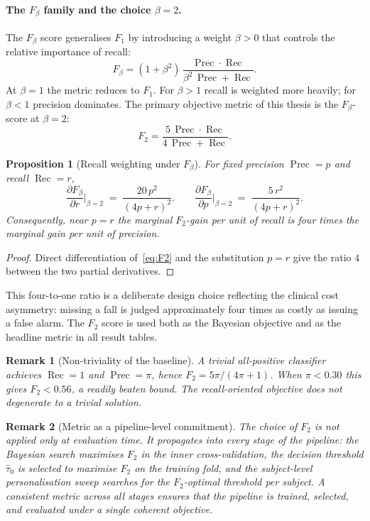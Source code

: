 \documentclass[onluarkali,ingilizce,yukseklisans,karton,LisansustuEgitim]{itutez}
\newtheorem{proposition}{Proposition}[chapter]
\newtheorem{remark}{Remark}[chapter]
\DeclareMathOperator{\Rec}{Rec}
\DeclareMathOperator{\Prec}{Prec}
\providecommand{\1}{\mathbf{1}}
\begin{document}
\paragraph{The $F_\beta$ family and the choice $\beta=2$.}
The $F_\beta$ score generalises $F_1$ by introducing a weight $\beta>0$ that controls the relative importance of recall:
\begin{equation}
  F_\beta = (1+\beta^2)\,\frac{\Prec\cdot\Rec}{\beta^2\,\Prec+\Rec}.
  \label{eq:Fbeta}
\end{equation}
At $\beta=1$ the metric reduces to $F_1$. For $\beta>1$ recall is weighted more heavily; for $\beta<1$ precision dominates. The primary objective metric of this thesis is the $F_\beta$-score at $\beta=2$:
\begin{equation}
  F_2=\frac{5\,\Prec\cdot\Rec}{4\,\Prec+\Rec}.
  \label{eq:F2}
\end{equation}

\begin{proposition}[Recall weighting under $F_\beta$]
\label{prop:F2-recall-weight}
For fixed precision $\Prec=p$ and recall $\Rec=r$,
\[
  \frac{\partial F_\beta}{\partial r}\bigg|_{\beta=2}\;=\;\frac{20\,p^2}{(4p+r)^2}.
  \qquad
  \frac{\partial F_\beta}{\partial p}\bigg|_{\beta=2}\;=\;\frac{5\,r^2}{(4p+r)^2}.
\]
Consequently, near $p=r$ the marginal $F_2$-gain per unit of recall is four times the marginal gain per unit of precision.
\end{proposition}

\begin{proof}
Direct differentiation of~\eqref{eq:F2} and the substitution $p=r$ give the ratio $4$ between the two partial derivatives.
\end{proof}

This four-to-one ratio is a deliberate design choice reflecting the clinical cost asymmetry: missing a fall is judged approximately four times as costly as issuing a false alarm. The $F_2$ score is used both as the Bayesian objective and as the headline metric in all result tables.

\begin{remark}[Non-triviality of the baseline]
\label{rem:f2-baseline}
A trivial all-positive classifier achieves $\Rec=1$ and $\Prec=\pi$, hence $F_2=5\pi/(4\pi+1)$. When $\pi<0.30$ this gives $F_2<0.56$, a readily beaten bound. The recall-oriented objective does not degenerate to a trivial solution.
\end{remark}

\begin{remark}[Metric as a pipeline-level commitment]
\label{rem:metric-commitment}
The choice of $F_2$ is not applied only at evaluation time. It propagates into every stage of the pipeline: the Bayesian search maximises $F_2$ in the inner cross-validation, the decision threshold $\hat\tau_0$ is selected to maximise $F_2$ on the training fold, and the subject-level personalisation sweep searches for the $F_2$-optimal threshold per subject. A consistent metric across all stages ensures that the pipeline is trained, selected, and evaluated under a single coherent objective.
\end{remark}
\end{document}
